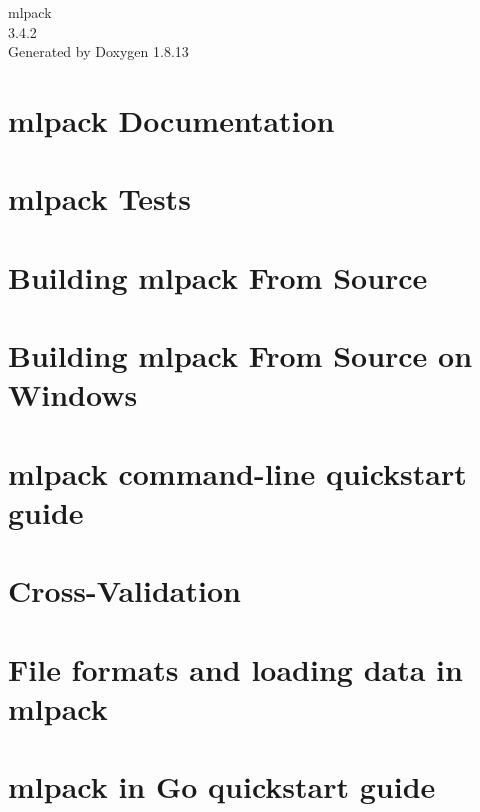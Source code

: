 \documentclass[twoside]{book}
\newcommand{\+}{\discretionary{\mbox{\scriptsize$\hookleftarrow$}}{}{}}
\newcommand{\clearemptydoublepage}{%
  \newpage{\pagestyle{empty}\cleardoublepage}%
}
\begin{document}
\begin{titlepage}
\vspace*{7cm}
\begin{center}%
{\Large mlpack \\[1ex]\large 3.\+4.\+2 }\\
\vspace*{1cm}
{\large Generated by Doxygen 1.8.13}\\
\end{center}
\end{titlepage}
\clearemptydoublepage
{}
\tableofcontents
\clearemptydoublepage
{}

\chapter{mlpack Documentation}
\label{index}
\chapter{mlpack Tests}
\label{md__home_aakash_mlpack_src_mlpack_tests_README}

\chapter{Building mlpack From Source}
\label{build}

\chapter{Building mlpack From Source on Windows}
\label{build_windows}

\chapter{mlpack command-\/line quickstart guide}
\label{cli_quickstart}

\chapter{Cross-\/\+Validation}
\label{cv}

\chapter{File formats and loading data in mlpack}
\label{formatdoc}

\chapter{mlpack in Go quickstart guide}
\label{go_quickstart}

\end{document}
